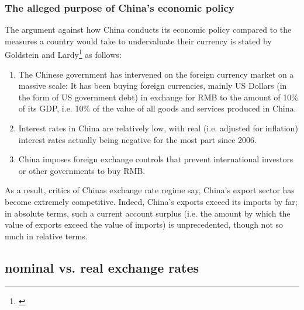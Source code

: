 \documentclass[11pt]{article}
\begin{document}
\subsubsection{The alleged purpose of China's economic policy}

The argument against how China conducts its economic policy compared to 
the measures a country would take to undervaluate their currency is 
stated by Goldstein and Lardy\footnote{\cite[pp.  
40]{GoldsteinLardy2008}} as follows:

\begin{enumerate}
\item{The Chinese government has intervened on the foreign currency 
		market on a massive scale: It has been buying foreign 
		currencies, mainly US Dollars (in the form of US government 
		debt) in exchange for RMB to the amount of 10\% of its GDP, i.e. 
		10\% of the value of all goods and services produced in China.} 
\item{Interest rates in China are relatively low, with real (i.e. adjusted for inflation) interest rates actually being negative for the most part since 2006.} %
\item{China imposes foreign exchange controls that prevent international investors or other governments to buy RMB.}%
\end{enumerate}

As a result, critics of Chinas exchange rate regime say, China's export sector has become extremely competitive. Indeed, China's exports exceed its imports by far; in absolute terms, such a current account surplus (i.e. the amount by which the value of exports exceed the value of imports) is unprecedented, though not so much in relative terms. %

 
\subsection{nominal vs. real exchange rates}
\end{document}
